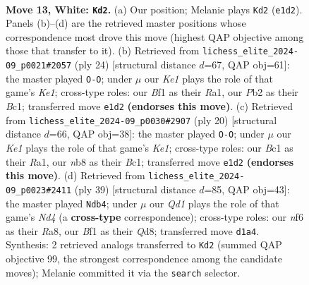 \documentclass[11pt]{article}
\begin{document}
\clearpage

\begin{figure}[p]\centering
\begin{subfigure}{0.46\textwidth}\centering
\resizebox{\linewidth}{!}{%
\newchessgame
\chessboard[
  setfen={rnbqk1r1/pp2bppp/5n2/3p2N1/3P4/2N5/PP3PPP/R1BQKB1R w - - 8 13},
  showmover=false,
  pgfstyle=straightmove, color=movearrow, markmove={e1-d2}
]}
\caption{}
\end{subfigure}\hfill
\begin{subfigure}{0.46\textwidth}\centering
\resizebox{\linewidth}{!}{%
\newchessgame
\chessboard[
  setfen={r1bq1rk1/ppp3pp/5n2/3pb3/8/2PBN3/PP3PPP/R1BQK2R w KQ - 0 13},
  showmover=false,
  pgfstyle=straightmove, color=movearrow, markmove={e1-g1}
]}
\caption{}
\end{subfigure}
\\[4pt]
\begin{subfigure}{0.46\textwidth}\centering
\resizebox{\linewidth}{!}{%
\newchessgame
\chessboard[
  setfen={r2qkb1r/pp1b1ppp/4pn2/8/3N4/2P5/PPB2PPP/R1BQK2R w KQkq - 1 11},
  showmover=false,
  pgfstyle=straightmove, color=movearrow, markmove={e1-g1}
]}
\caption{}
\end{subfigure}\hfill
\begin{subfigure}{0.46\textwidth}\centering
\resizebox{\linewidth}{!}{%
\newchessgame
\chessboard[
  setfen={r2qrbk1/pp3pp1/2n1b2p/1N1n4/P3N3/3B2BP/1P3PP1/2RQR1K1 b - - 2 20},
  showmover=false,
  pgfstyle=straightmove, color=movearrow, markmove={d5-b4}
]}
\caption{}
\end{subfigure}
\caption{\textbf{Move 13, White: \texttt{Kd2}.} (a) Our position; Melanie plays \texttt{Kd2} (\texttt{e1d2}). Panels (b)--(d) are the retrieved master positions whose correspondence most drove this move (highest QAP objective among those that transfer to it). (b) Retrieved from \texttt{lichess\_elite\_2024-09\_p0021\#2057} (ply 24) [structural distance $d$=67, QAP obj=61]: the master played \texttt{O-O}; under $\mu$ our \emph{Ke1} plays the role of that game's \emph{Ke1}; cross-type roles: our \emph{B}f1 as their \emph{R}a1, our \emph{P}b2 as their \emph{B}c1; transferred move \texttt{e1d2} \textbf{(endorses this move)}. (c) Retrieved from \texttt{lichess\_elite\_2024-09\_p0030\#2907} (ply 20) [structural distance $d$=66, QAP obj=38]: the master played \texttt{O-O}; under $\mu$ our \emph{Ke1} plays the role of that game's \emph{Ke1}; cross-type roles: our \emph{B}c1 as their \emph{R}a1, our \emph{n}b8 as their \emph{B}c1; transferred move \texttt{e1d2} \textbf{(endorses this move)}. (d) Retrieved from \texttt{lichess\_elite\_2024-09\_p0023\#2411} (ply 39) [structural distance $d$=85, QAP obj=43]: the master played \texttt{Ndb4}; under $\mu$ our \emph{Qd1} plays the role of that game's \emph{Nd4} (a \textbf{cross-type} correspondence); cross-type roles: our \emph{n}f6 as their \emph{R}a8, our \emph{B}f1 as their \emph{Q}d8; transferred move \texttt{d1a4}. Synthesis: 2 retrieved analogs transferred to \texttt{Kd2} (summed QAP objective 99, the strongest correspondence among the candidate moves); Melanie committed it via the \texttt{search} selector.}
\label{fig:thought-m24}
\end{figure}
\end{document}
